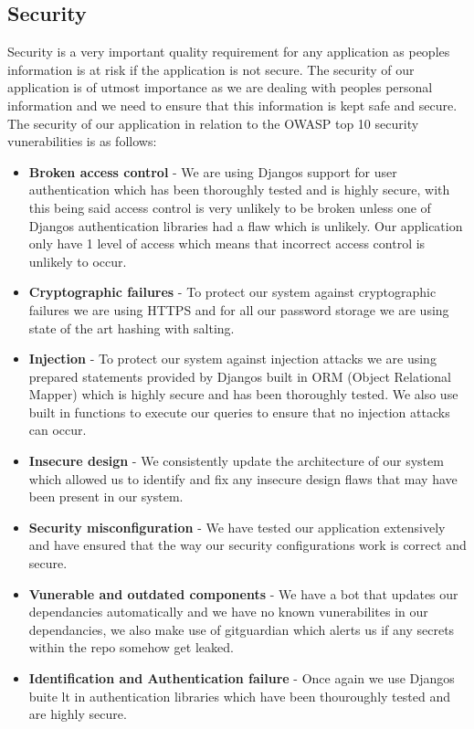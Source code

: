 \documentclass[12pt]{article}
\begin{document}
\newpage
\subsection{Security}
Security is a very important quality requirement for any application as peoples information is at risk if the application is not secure. The security of our application is of utmost importance as we are dealing with peoples personal information and we need to ensure that this information is kept safe and secure. The security of our application in relation to the OWASP top 10 security vunerabilities is as follows:
\begin{itemize}
    \item \textbf{Broken access control} - We are using Djangos support for user authentication which has been thoroughly tested and is highly secure, with this being said access control is very unlikely to be broken unless one of Djangos authentication libraries had a flaw which is unlikely. Our application only have 1 level of access which means that incorrect access control is unlikely to occur.
    \item \textbf{Cryptographic failures} - To protect our system against cryptographic failures we are using HTTPS and for all our password storage we are using state of the art hashing with salting.
    \item \textbf{Injection} - To protect our system against injection attacks we are using prepared statements provided by Djangos built in ORM (Object Relational Mapper) which is highly secure and has been thoroughly tested. We also use built in functions to execute our queries to ensure that no injection attacks can occur.
    \item \textbf{Insecure design} - We consistently update the architecture of our system which allowed us to identify and fix any insecure design flaws that may have been present in our system.
    \item \textbf{Security misconfiguration} - We have tested our application extensively and have ensured that the way our security configurations work is correct and secure.
    \item \textbf{Vunerable and outdated components} - We have a bot that updates our dependancies automatically and we have no known vunerabilites in our dependancies, we also make use of gitguardian which alerts us if any secrets within the repo somehow get leaked.
    \item \textbf{Identification and Authentication failure} - Once again we use Djangos buite lt in authentication libraries which have been thouroughly tested and are highly secure.

\end{itemize}
\end{document}
